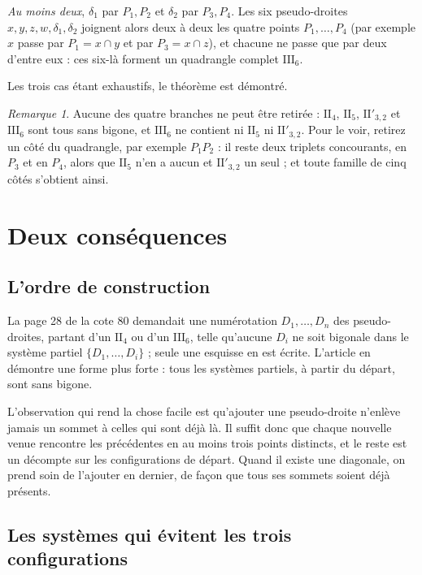 \documentclass[11pt,a4paper]{amsart}
\theoremstyle{definition}
\theoremstyle{plain}
\theoremstyle{remark}
\newtheorem{remarque}{Remarque}
\newcommand{\II}[1]{\mathrm{II}_{#1}}
\newcommand{\IIp}{\mathrm{II}'_{3,2}}
\newcommand{\III}{\mathrm{III}_{6}}
\begin{document}
\emph{Au moins deux}, $\delta_1$ par $P_1, P_2$ et $\delta_2$ par $P_3, P_4$. Les six pseudo-droites $x, y, z, w, \delta_1, \delta_2$ joignent alors deux à deux les quatre points $P_1, \dots, P_4$ (par exemple $x$ passe par $P_1 = x \cap y$ et par $P_3 = x \cap z$), et chacune ne passe que par deux d'entre eux : ces six-là forment un quadrangle complet $\III$.

Les trois cas étant exhaustifs, le théorème est démontré.

\begin{remarque}
Aucune des quatre branches ne peut être retirée : $\II4$, $\II5$, $\IIp$ et $\III$ sont tous sans bigone, et $\III$ ne contient ni $\II5$ ni $\IIp$. Pour le voir, retirez un côté du quadrangle, par exemple $P_1P_2$ : il reste deux triplets concourants, en $P_3$ et en $P_4$, alors que $\II5$ n'en a aucun et $\IIp$ un seul ; et toute famille de cinq côtés s'obtient ainsi.
\end{remarque}

\section{Deux conséquences}

\subsection{L'ordre de construction}

La page 28 de la cote 80 demandait une numérotation $D_1, \dots, D_n$ des pseudo-droites, partant d'un $\II4$ ou d'un $\III$, telle qu'aucune $D_i$ ne soit bigonale dans le système partiel $\{D_1, \dots, D_i\}$ ; seule une esquisse en est écrite. L'article en démontre une forme plus forte : tous les systèmes partiels, à partir du départ, sont sans bigone.

L'observation qui rend la chose facile est qu'ajouter une pseudo-droite n'enlève jamais un sommet à celles qui sont déjà là. Il suffit donc que chaque nouvelle venue rencontre les précédentes en au moins trois points distincts, et le reste est un décompte sur les configurations de départ. Quand il existe une diagonale, on prend soin de l'ajouter en dernier, de façon que tous ses sommets soient déjà présents.

\subsection{Les systèmes qui évitent les trois configurations}
\end{document}
